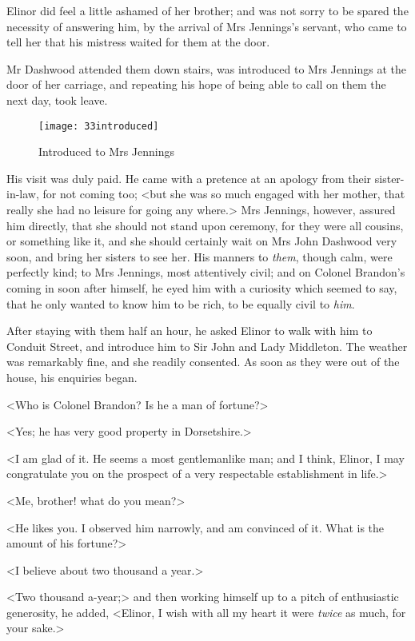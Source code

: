 Elinor did feel a little ashamed of her brother; and was not sorry to be spared the necessity of answering him, by the arrival of Mrs Jennings's servant, who came to tell her that his mistress waited for them at the door.

Mr Dashwood attended them down stairs, was introduced to Mrs Jennings at the door of her carriage, and repeating his hope of being able to call on them the next day, took leave.

\begin{figure}[tbph]
\centering
\texttt{[image: 33introduced]}
\caption{Introduced to Mrs Jennings}
\end{figure}

His visit was duly paid. He came with a pretence at an apology from their sister-in-law, for not coming too; <but she was so much engaged with her mother, that really she had no leisure for going any where.> Mrs Jennings, however, assured him directly, that she should not stand upon ceremony, for they were all cousins, or something like it, and she should certainly wait on Mrs John Dashwood very soon, and bring her sisters to see her. His manners to \textit{them}, though calm, were perfectly kind; to Mrs Jennings, most attentively civil; and on Colonel Brandon's coming in soon after himself, he eyed him with a curiosity which seemed to say, that he only wanted to know him to be rich, to be equally civil to \textit{him}.

After staying with them half an hour, he asked Elinor to walk with him to Conduit Street, and introduce him to Sir John and Lady Middleton. The weather was remarkably fine, and she readily consented. As soon as they were out of the house, his enquiries began.

<Who is Colonel Brandon? Is he a man of fortune?>

<Yes; he has very good property in Dorsetshire.>

<I am glad of it. He seems a most gentlemanlike man; and I think, Elinor, I may congratulate you on the prospect of a very respectable establishment in life.>

<Me, brother! what do you mean?>

<He likes you. I observed him narrowly, and am convinced of it. What is the amount of his fortune?>

<I believe about two thousand a year.>

<Two thousand a-year;> and then working himself up to a pitch of enthusiastic generosity, he added, <Elinor, I wish with all my heart it were \textit{twice} as much, for your sake.>

